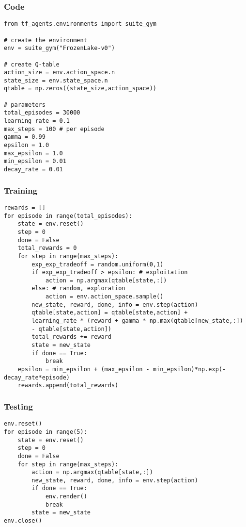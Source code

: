 \begin{frame}[fragile]\frametitle{Code}

\begin{lstlisting}
from tf_agents.environments import suite_gym

# create the environment
env = suite_gym("FrozenLake-v0")

# create Q-table
action_size = env.action_space.n
state_size = env.state_space.n
qtable = np.zeros((state_size,action_space))

# parameters
total_episodes = 30000
learning_rate = 0.1
max_steps = 100 # per episode
gamma = 0.99
epsilon = 1.0
max_epsilon = 1.0
min_epsilon = 0.01
decay_rate = 0.01

\end{lstlisting}

\end{frame}


\begin{frame}[fragile]\frametitle{Training}

\begin{lstlisting}
rewards = []
for episode in range(total_episodes):
	state = env.reset()
	step = 0
	done = False
	total_rewards = 0
	for step in range(max_steps):
		exp_exp_tradeoff = random.uniform(0,1)
		if exp_exp_tradeoff > epsilon: # exploitation
			action = np.argmax(qtable[state,:])
		else: # random, exploration
			action = env.action_space.sample()
		new_state, reward, done, info = env.step(action)
		qtable[state,action] = qtable[state,action] + 
		learning_rate * (reward + gamma * np.max(qtable[new_state,:]) 
		- qtable[state,action]) 
		total_rewards += reward
		state = new_state
		if done == True:
			break
	epsilon = min_epsilon + (max_epsilon - min_epsilon)*np.exp(-decay_rate*episode)
	rewards.append(total_rewards)

\end{lstlisting}

\end{frame}

\begin{frame}[fragile]\frametitle{Testing}

\begin{lstlisting}
env.reset()
for episode in range(5):
	state = env.reset()
	step = 0
	done = False
	for step in range(max_steps):
		action = np.argmax(qtable[state,:])
		new_state, reward, done, info = env.step(action)
		if done == True:
			env.render()
			break
		state = new_state
env.close()
\end{lstlisting}

\end{frame}


